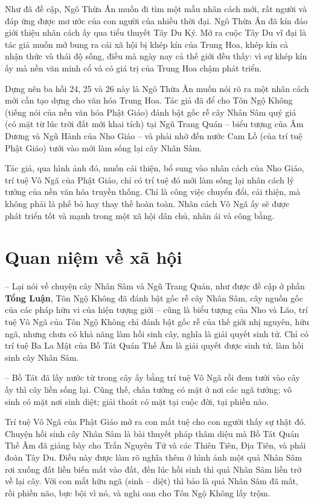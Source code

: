 Như đã đề cập, Ngô Thừa Ân muốn đi tìm một mẫu nhân cách mới, rất người và đáp ứng được mơ ước của con người của nhiều thời đại. Ngô Thừa Ân đã kín đáo giới thiệu nhân cách ấy qua tiểu thuyết Tây Du Ký. Mở ra cuộc Tây Du vĩ đại là tác giả muốn mở bung ra cái xã hội bị khép kín của Trung Hoa, khép kín cả nhận thức và thái độ sống, điều mà ngày nay cả thế giới đều thấy: vì sự khép kín ấy mà nền văn minh cổ và có giá trị của Trung Hoa chậm phát triển.

Dựng nên ba hồi 24, 25 và 26 này là Ngô Thừa Ân muốn nói rõ ra một nhân cách mới cần tạo dựng cho văn hóa Trung Hoa. Tác giả đã để cho Tôn Ngộ Không (tiếng nói của nền văn hóa Phật Giáo) đánh bật gốc rễ cây Nhân Sâm quý giá (có mặt từ lúc trời đất mới khai tích) tại Ngũ Trang Quán -- biểu tượng của Âm Dương và Ngũ Hành của Nho Giáo -- và phải nhờ đến nước Cam Lồ (của trí tuệ Phật Giáo) tưới vào mới làm sống lại cây Nhân Sâm.

Tác giả, qua hình ảnh đó, muốn cải thiện, bổ sung vào nhân cách của Nho Giáo, trí tuệ Vô Ngã của Phật Giáo, chỉ có trí tuệ đó mới làm sống lại nhân cách lý tưởng của nền văn hóa truyền thống. Chỉ là công việc chuyển đổi, cải thiện, mà không phải là phế bỏ hay thay thế hoàn toàn. Nhân cách Vô Ngã ấy sẽ được phát triển tốt và mạnh trong một xã hội dân chủ, nhân ái và công bằng.

\section{Quan niệm về xã hội} %
\label{sec:24_25_26_xa_hoi}

-- Lại nói về chuyện cây Nhân Sâm và Ngũ Trang Quán, như được đề cập ở phần {\bf Tổng Luận}, Tôn Ngộ Không đã đánh bật gốc rễ cây Nhân Sâm, cây nguồn gốc của các pháp hữu vi của hiện tượng giới -- cũng là biểu tượng của Nho và Lão, trí tuệ Vô Ngã của Tôn Ngộ Không chỉ đánh bật gốc rễ của thế giới nhị nguyên, hữu ngã, nhưng chưa có khả năng làm hồi sinh cây, nghĩa là giải quyết sinh tử. Chỉ có trí tuệ Ba La Mật của Bồ Tát Quán Thế Âm là giải quyết được sinh tử, làm hồi sinh cây Nhân Sâm.

-- Bồ Tát đã lấy nước từ trong cây ấy bằng trí tuệ Vô Ngã rồi đem tưới vào cây ấy thì cây liền sống lại. Cũng thế, chân tướng có mặt ở nơi các ngã tướng; vô sinh có mặt nơi sinh diệt; giải thoát có mặt tại cuộc đời, tại phiền não.

Trí tuệ Vô Ngã của Phật Giáo mở ra con mắt tuệ cho con người thấy sự thật đó. Chuyện hồi sinh cây Nhân Sâm là bài thuyết pháp thâm diệu mà Bồ Tát Quán Thế Âm đã giảng bày cho Trấn Nguyên Tử và các Thiên Tiên, Địa Tiên, và phái đoàn Tây Du. Điều này được làm rõ nghĩa thêm ở hình ảnh một quả Nhân Sâm rơi xuống đất liền biến mất vào đất, đến lúc hồi sinh thì quả Nhân Sâm liền trở về lại cây. Với con mắt hữu ngã (sinh -- diệt) thì bảo là quả Nhân Sâm đã mất, rồi phiền não, bực bội vì nó, và nghi oan cho Tôn Ngộ Không lấy trộm.

